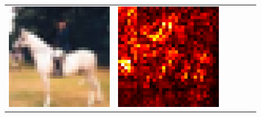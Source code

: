 \documentclass[preprint,12pt]{elsarticle}
\begin{document}
\begin{figure}[p]
\begin{tabular}{cccccc}
  \includegraphics[scale=\scale]{../visualizations/examples/cifar10/resnet18/images/7.png} &
  \includegraphics[scale=\scale]{../visualizations/examples/cifar10/resnet18/saliency_map/7.png} & 

\end{tabular}
\end{figure}
\end{document}

